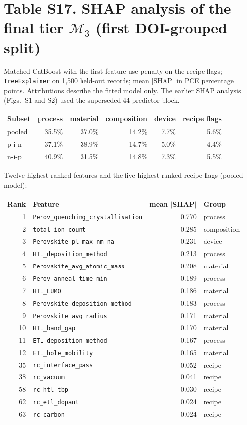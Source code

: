 \documentclass[10pt]{article}
\begin{document}
\section*{Table S17. SHAP analysis of the final tier $\mathcal{M}_3$ (first DOI-grouped split)}
Matched CatBoost with the first-feature-use penalty on the recipe flags; \texttt{TreeExplainer} on 1,500 held-out records; mean $|$SHAP$|$ in PCE percentage points. Attributions describe the fitted model only. The earlier SHAP analysis (Figs.\ S1 and S2) used the superseded 44-predictor block.\par\smallskip
\begin{tabular}{lrrrrr}\toprule Subset & process & material & composition & device & recipe flags\\\midrule
pooled & 35.5\% & 37.0\% & 14.2\% & 7.7\% & 5.6\%\\
p-i-n & 37.1\% & 38.9\% & 14.7\% & 5.0\% & 4.4\%\\
n-i-p & 40.9\% & 31.5\% & 14.8\% & 7.3\% & 5.5\%\\
\bottomrule\end{tabular}\par\medskip
\noindent Twelve highest-ranked features and the five highest-ranked recipe flags (pooled model):\par\smallskip\begin{tabular}{rlrl}\toprule Rank & Feature & mean $|$SHAP$|$ & Group\\\midrule
1 & \texttt{Perov\_quenching\_crystallisation} & 0.770 & process\\
2 & \texttt{total\_ion\_count} & 0.285 & composition\\
3 & \texttt{Perovskite\_pl\_max\_nm\_na} & 0.231 & device\\
4 & \texttt{HTL\_deposition\_method} & 0.213 & process\\
5 & \texttt{Perovskite\_avg\_atomic\_mass} & 0.208 & material\\
6 & \texttt{Perov\_anneal\_time\_min} & 0.189 & process\\
7 & \texttt{HTL\_LUMO} & 0.186 & material\\
8 & \texttt{Perovskite\_deposition\_method} & 0.183 & process\\
9 & \texttt{Perovskite\_avg\_radius} & 0.171 & material\\
10 & \texttt{HTL\_band\_gap} & 0.170 & material\\
11 & \texttt{ETL\_deposition\_method} & 0.167 & process\\
12 & \texttt{ETL\_hole\_mobility} & 0.165 & material\\
35 & \texttt{rc\_interface\_pass} & 0.052 & recipe\\
38 & \texttt{rc\_vacuum} & 0.041 & recipe\\
58 & \texttt{rc\_htl\_tbp} & 0.030 & recipe\\
62 & \texttt{rc\_etl\_dopant} & 0.024 & recipe\\
63 & \texttt{rc\_carbon} & 0.024 & recipe\\
\bottomrule\end{tabular}\par
\end{document}
